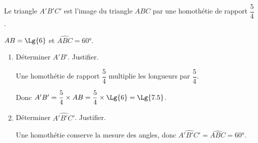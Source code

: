     Le triangle $A'B'C'$ est l'image du triangle $ABC$ par une homothétie de rapport $\dfrac{5}{4}$.

    $AB=\Lg{6}$ et $\widehat{ABC}=\ang{60}$.
    \begin{enumerate}
        \item Déterminer $A'B'$. Justifier.

        {\color{red} Une homothétie de rapport $\dfrac{5}{4}$ multiplie les longueurs par $\dfrac{5}{4}$.

        Donc $A'B' = \dfrac{5}{4}\times AB = \dfrac{5}{4}\times\Lg{6}=\Lg{7.5}$.}
        \item Déterminer $\widehat{A'B'C'}$. Justifier.

        {\color{red} Une homothétie conserve la mesure des angles, donc $\widehat{A'B'C'}=\widehat{ABC}=\ang{60}$.}
    \end{enumerate}

